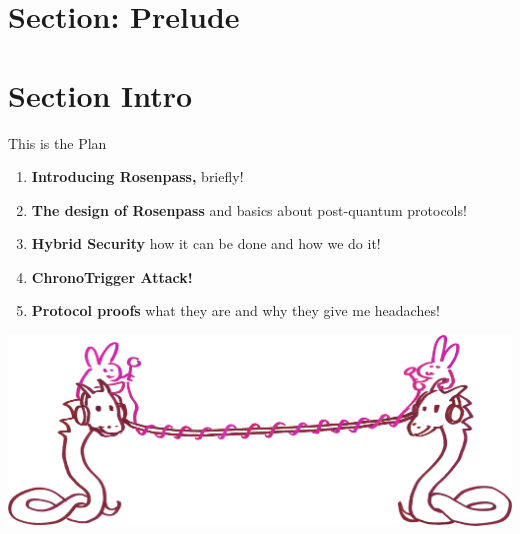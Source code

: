 \hypertarget{section-prelude}{%
\section{Section: Prelude}\label{section-prelude}}

\hypertarget{section-intro}{%
\section{Section Intro}\label{section-intro}}



\begin{frame}[s]{This is the Plan}
  \hypertarget{todays-talk}{}
  \begin{enumerate}
   \setlength{\itemsep}{1ex plus 1 fil}
    \item \textbf{Introducing Rosenpass,} briefly!
    \item \textbf{The design of Rosenpass} and basics about post-quantum protocols!
    \item \textbf{Hybrid Security} how it can be done and how we do it!
    \item \textbf{ChronoTrigger Attack!}
    \item \textbf{Protocol proofs} what they are and why they give me headaches!
  \end{enumerate}

  \begin{center}
    \includegraphics[height=.3\textheight]{graphics/wireguard-and-rp-bunny-rose.png}
  \end{center}
\end{frame}



